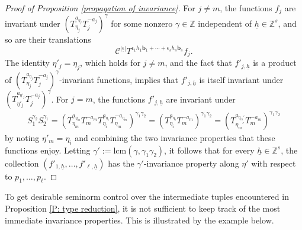 \documentclass[11pt]{amsart}
\theoremstyle{definition}
\newcommand{\Z}{{\mathbb Z}}
\newcommand{\CC}{{\mathcal C}}
\renewcommand{\b}{{\textbf{b}}}
\newcommand{\uh}{{\underline{h}}}
\newcommand{\eps}{\epsilon}
\newcommand{\ueps}{{\underline{\epsilon}}}
\newcommand{\brac}[1]{\mathopen{}\left( #1 \mathclose{}\right)}
\begin{document}
\begin{proof}[Proof of Proposition \ref{propagation of invariance}]
For $j\neq m$, the functions $f_{j}$ are invariant under $\brac{T_{\eta_j}^{a_{\eta_j}}T_j^{-a_j}}^\gamma$ for some nonzero $\gamma\in\Z$ independent of $\uh\in\Z^s$, and so are their translations $$\CC^{|\ueps|}T^{\eps_1 h_1 \b_1 + \cdots + \eps_{s} h_s \b_s}f_j.$$ The identity $\eta'_j = \eta_j$, which holds for $j\neq m$,  and the fact that $f'_{j, \uh}$ is a product of $\brac{T_{\eta_j}^{a_{\eta_j}}T_j^{-a_j}}^\gamma$-invariant functions, implies that $f'_{j, \uh}$ is itself invariant under $\brac{T_{\eta'_j}^{a_{\eta'_j}}T_j^{-a_j}}^\gamma$. For $j=m$, the functions $f'_{j, \uh}$ are invariant under
\begin{align*}
    S_1^{\gamma_2}S_2^{\gamma_1} = \brac{T_{\eta_m}^{a_{\eta_m}}T_m^{-a_m}T_{\eta_i}^{a_{\eta_i}}T_{\eta_m}^{-a_{\eta_m}}}^{\gamma_1\gamma_2} = \brac{T_{\eta_i}^{a_{\eta_i}}T_m^{-a_m}}^{\gamma_1\gamma_2}=\brac{T_{\eta_m'}^{a_{\eta_m'}}T_m^{-a_m}}^{\gamma_1\gamma_2}
\end{align*}
by noting $\eta'_m = \eta_i$ and combining the two invariance properties that these functions enjoy. Letting $\gamma' := \textrm{lcm}(\gamma, \gamma_1\gamma_2)$, it follows that for every $\uh\in\Z^s$, the collection $(f'_{1, \uh}, \ldots, f'_{\ell, \uh})$ has the $\gamma'$-invariance property along $\eta'$ with respect to $p_1, \ldots, p_\ell$.
\end{proof}




To get desirable seminorm control over the intermediate tuples encountered in Proposition \ref{P: type reduction}, it is not sufficient to keep track of the most immediate invariance properties. This is illustrated by the example below.
\end{document}
